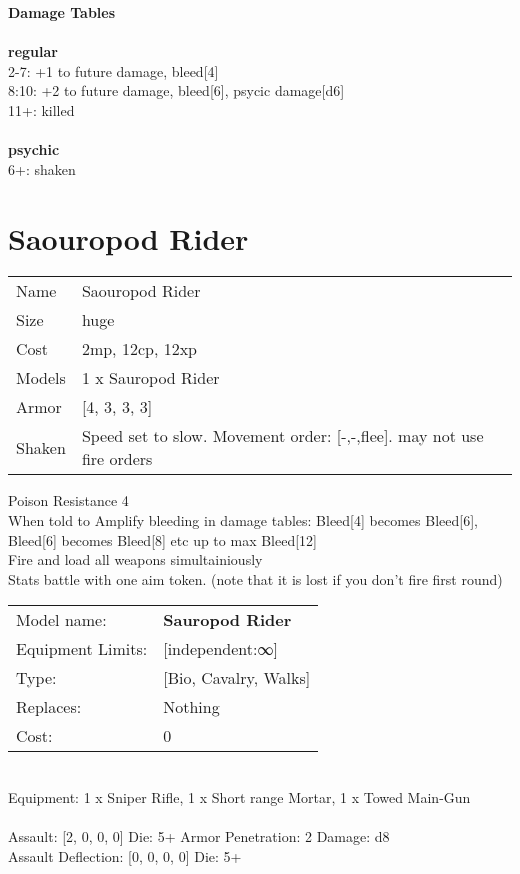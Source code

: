 {\bf Damage Tables} \\
\ \\ {\bf regular } \\
2-7: +1 to future damage, bleed[4] \\
8:10: +2 to future damage, bleed[6], psycic damage[d6] \\
11+: killed \\
\ \\ {\bf psychic } \\
6+: shaken \\










\pagebreak\pagebreak

\section{ Saouropod Rider }

\begin{tabular}{ll}
  Name & Saouropod Rider \\
  Size & huge\\
  Cost & 2mp, 12cp, 12xp\\
  Models & 1 x Sauropod Rider\\
  Armor & [4, 3, 3, 3]\\
  Shaken & Speed set to slow. Movement order: [-,-,flee]. may not use fire orders\\
\end{tabular}

\noindent Poison Resistance 4\\ 
When told to Amplify bleeding in damage tables: Bleed[4] becomes Bleed[6], Bleed[6] becomes Bleed[8] etc up to max Bleed[12]\\ 
Fire and load all weapons simultainiously\\ 
Stats battle with one aim token. (note that it is lost if you don't fire first round)\\ 


\noindent
\begin{tabular}{ll}
Model name: &{\bf Sauropod Rider } \\
Equipment Limits: &[independent:∞] \\
Type: &[Bio, Cavalry, Walks] \\
Replaces: &Nothing \\
Cost: & 0\\
\end{tabular}
\ \\
Equipment: 1 x Sniper Rifle, 1 x Short range Mortar, 1 x Towed Main-Gun \\
\ \\
Assault: [2, 0, 0, 0] Die: 5+ Armor Penetration: 2 Damage: d8 \\
Assault Deflection: [0, 0, 0, 0] Die: 5+\\
\indent  
\ \\

